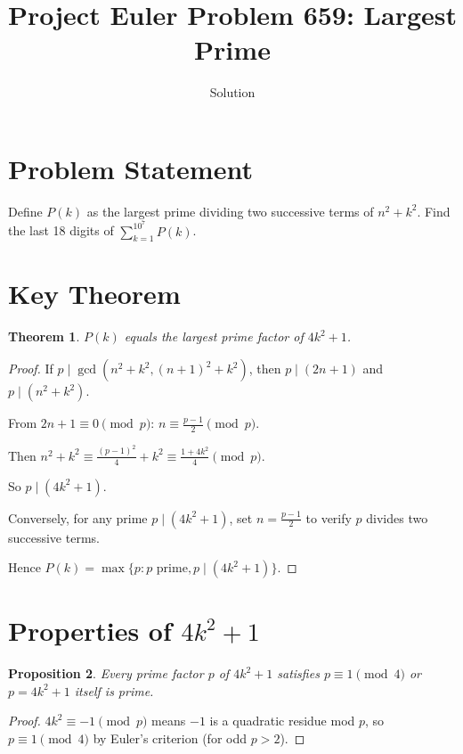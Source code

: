 \documentclass[12pt]{article}
\title{Project Euler Problem 659: Largest Prime}
\author{Solution}
\date{}
\newtheorem{theorem}{Theorem}
\newtheorem{proposition}[theorem]{Proposition}
\theoremstyle{definition}
\begin{document}
\maketitle

\section{Problem Statement}

Define $P(k)$ as the largest prime dividing two successive terms of $n^2 + k^2$.
Find the last 18 digits of $\displaystyle\sum_{k=1}^{10^7} P(k)$.

\section{Key Theorem}

\begin{theorem}
$P(k)$ equals the largest prime factor of $4k^2 + 1$.
\end{theorem}

\begin{proof}
If $p \mid \gcd(n^2+k^2, (n+1)^2+k^2)$, then $p \mid (2n+1)$ and $p \mid (n^2+k^2)$.

From $2n+1 \equiv 0 \pmod{p}$: $n \equiv \frac{p-1}{2} \pmod{p}$.

Then $n^2 + k^2 \equiv \frac{(p-1)^2}{4} + k^2 \equiv \frac{1+4k^2}{4} \pmod{p}$.

So $p \mid (4k^2+1)$.

Conversely, for any prime $p \mid (4k^2+1)$, set $n = \frac{p-1}{2}$ to verify $p$ divides two successive terms.

Hence $P(k) = \max\{p : p \text{ prime}, p \mid (4k^2+1)\}$.
\end{proof}

\section{Properties of $4k^2+1$}

\begin{proposition}
Every prime factor $p$ of $4k^2+1$ satisfies $p \equiv 1 \pmod{4}$ or $p = 4k^2+1$ itself is prime.
\end{proposition}

\begin{proof}
$4k^2 \equiv -1 \pmod{p}$ means $-1$ is a quadratic residue mod $p$, so $p \equiv 1 \pmod{4}$ by Euler's criterion (for odd $p > 2$).
\end{proof}
\end{document}
